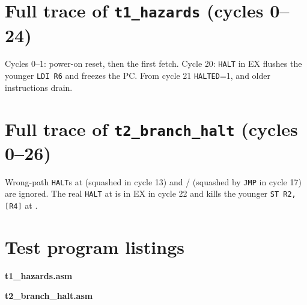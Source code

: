 \documentclass[10pt,a4paper]{article}
\begin{document}
\appendix
\begin{landscape}
\section{Full trace of \texttt{t1\_hazards} (cycles 0--24)}
Cycles 0--1: power-on reset, then the first fetch. Cycle 20: \texttt{HALT} in EX flushes the younger \texttt{LDI R6} and freezes the PC.
From cycle 21 \texttt{HALTED}=1, and older instructions drain.
\begin{tracetab}

\end{tracetab}
\section{Full trace of \texttt{t2\_branch\_halt} (cycles 0--26)}
Wrong-path \texttt{HALT}s at  (squashed in cycle 13) and / (squashed by \texttt{JMP} in cycle 17) are
ignored. The real \texttt{HALT} at  is in EX in cycle 22 and kills the younger \texttt{ST R2,[R4]} at .
\begin{tracetab}

\end{tracetab}
\end{landscape}
\section{Test program listings}
\textbf{t1\_hazards.asm}
\begin{listtab}

\end{listtab}
\textbf{t2\_branch\_halt.asm}
\begin{listtab}

\end{listtab}
\end{document}
